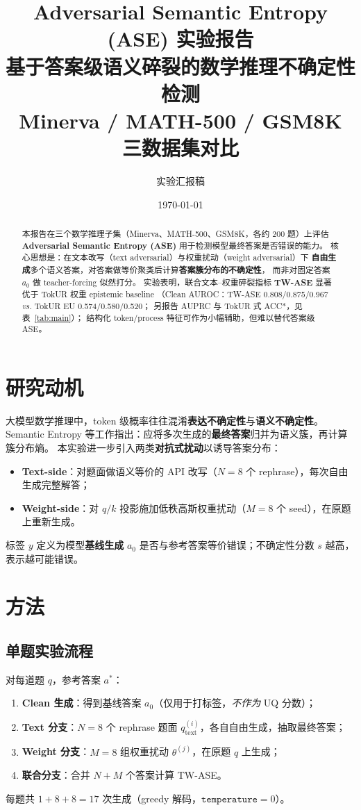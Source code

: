 \documentclass[11pt,a4paper]{article}
\title{\textbf{Adversarial Semantic Entropy (ASE) 实验报告}\\[0.4em]
\large 基于答案级语义碎裂的数学推理不确定性检测\\
\small Minerva / MATH-500 / GSM8K 三数据集对比}
\author{实验汇报稿}
\date{\today}
\begin{document}
\maketitle

\begin{abstract}
本报告在三个数学推理子集（Minerva、MATH-500、GSM8K，各约 200 题）上评估
\textbf{Adversarial Semantic Entropy (ASE)} 用于检测模型最终答案是否错误的能力。
核心思想是：在文本改写（text adversarial）与权重扰动（weight adversarial）下
\textbf{自由生成}多个语义答案，对答案做等价聚类后计算\textbf{答案簇分布的不确定性}，
而非对固定答案 $a_0$ 做 teacher-forcing 似然打分。
实验表明，联合文本--权重碎裂指标 \textbf{TW-ASE} 显著优于 TokUR 权重 epistemic baseline
（Clean AUROC：TW-ASE 0.808/0.875/0.967 \emph{vs.} TokUR EU 0.574/0.580/0.520；
另报告 AUPRC 与 TokUR 式 ACC*，见表~\ref{tab:main}）；
结构化 token/process 特征可作为小幅辅助，但难以替代答案级 ASE。
\end{abstract}

\section{研究动机}

大模型数学推理中，token 级概率往往混淆\textbf{表达不确定性}与\textbf{语义不确定性}。
Semantic Entropy 等工作指出：应将多次生成的\textbf{最终答案}归并为语义簇，再计算簇分布熵。
本实验进一步引入两类\textbf{对抗式扰动}以诱导答案分布：
\begin{itemize}
  \item \textbf{Text-side}：对题面做语义等价的 API 改写（$N{=}8$ 个 rephrase），每次自由生成完整解答；
  \item \textbf{Weight-side}：对 $q/k$ 投影施加低秩高斯权重扰动（$M{=}8$ 个 seed），在原题上重新生成。
\end{itemize}
标签 $y$ 定义为模型\textbf{基线生成} $a_0$ 是否与参考答案等价错误；不确定性分数 $s$ 越高，表示越可能错误。

\section{方法}

\subsection{单题实验流程}

对每道题 $q$，参考答案 $a^\ast$：
\begin{enumerate}
  \item \textbf{Clean 生成}：得到基线答案 $a_0$（仅用于打标签，\emph{不作为} UQ 分数）；
  \item \textbf{Text 分支}：$N{=}8$ 个 rephrase 题面 $q^{(i)}_{\mathrm{text}}$，各自自由生成，抽取最终答案；
  \item \textbf{Weight 分支}：$M{=}8$ 组权重扰动 $\theta^{(j)}$，在原题 $q$ 上生成；
  \item \textbf{联合分支}：合并 $N{+}M$ 个答案计算 TW-ASE。
\end{enumerate}
每题共 $1{+}8{+}8{=}17$ 次生成（greedy 解码，$\texttt{temperature}{=}0$）。
\end{document}
